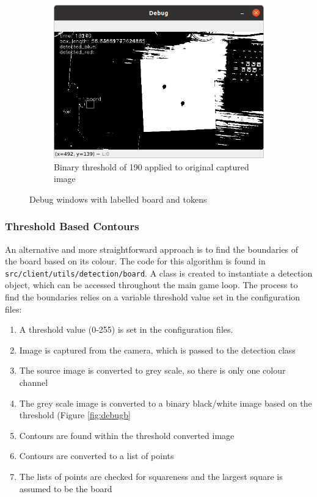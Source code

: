 \documentclass[12pt]{article}
\begin{document}
\begin{figure}[H]
\begin{subfigure}{0.4\textwidth}
        \includegraphics[width=1\textwidth]{images/figures/fig8c}
        \caption{Binary threshold of 190 applied to original captured image}
        \label{fig:debugc}
    \end{subfigure}
    \caption{Debug windows with labelled board and tokens}
    \label{fig:debug}
\end{figure}

\subsubsection{Threshold Based Contours}
An alternative and more straightforward approach is to find the boundaries of the board based on its colour. 
The code for this algorithm is found in \\
\texttt{src/client/utils/detection/board}.
A class is created to instantiate a detection object, which can be accessed throughout the main game loop.
The process to find the boundaries relies on a variable threshold value set in the configuration files:
\begin{enumerate}
    \item A threshold value (0-255) is set in the configuration files. 
    \item Image is captured from the camera, which is passed to the detection class
    \item The source image is converted to grey scale, so there is only one colour channel
    \item The grey scale image is converted to a binary black/white image based on the threshold (Figure \ref{fig:debugb}
    \item Contours are found within the threshold converted image
    \item Contours are converted to a list of points
    \item The lists of points are checked for squareness and the largest square is assumed to be the board
\end{enumerate}
\end{document}
